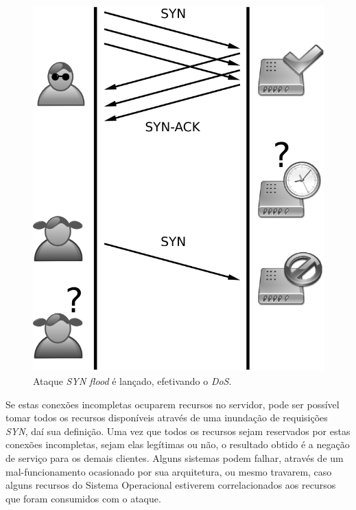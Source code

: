\begin{figure}[H]
    \begin{center}
        \includegraphics[scale=0.6]{./figuras/Tcp_synflood-GS.png}

        \caption{\label{figura:threeway_synflood}Ataque \textit{SYN flood} é lançado, efetivando o \textit{DoS}.}
    \end{center}
\end{figure}

Se estas conexões incompletas ocuparem recursos no servidor, pode ser possível tomar todos os recursos disponíveis através de uma inundação de requisições \textit{SYN}, daí sua definição. Uma vez que todos os recursos sejam reservados por estas conexões incompletas, sejam elas legítimas ou não, o resultado obtido é a negação de serviço para os demais clientes. Alguns sistemas podem falhar, através de um mal-funcionamento ocasionado por sua arquitetura, ou mesmo travarem, caso alguns recursos do Sistema Operacional estiverem correlacionados aos recursos que foram consumidos com o ataque.

